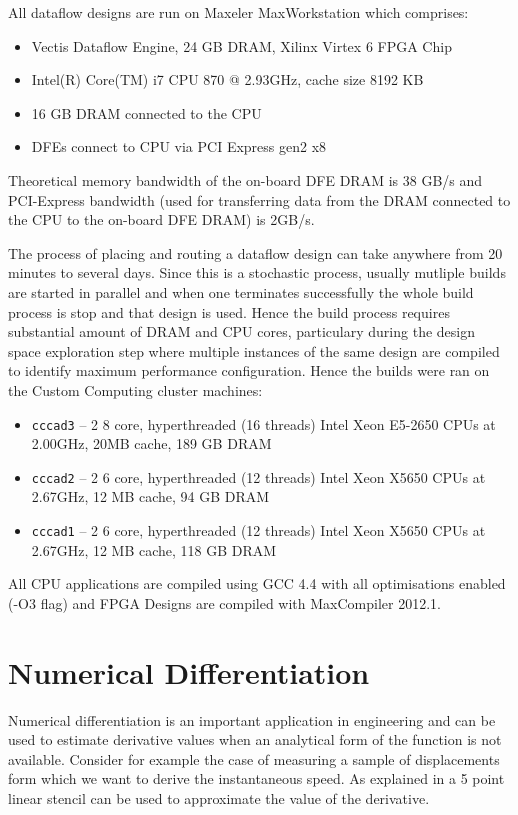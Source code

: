 All dataflow designs are run on Maxeler MaxWorkstation
\cite{MaxWorkstation} which comprises:
\begin{itemize}
\item Vectis Dataflow Engine, 24 GB DRAM, Xilinx Virtex 6 FPGA Chip
\item Intel(R) Core(TM) i7 CPU 870 @ 2.93GHz, cache size 8192 KB
\item 16 GB DRAM connected to the CPU
\item DFEs connect to CPU via PCI Express gen2 x8
\end{itemize}

Theoretical memory bandwidth of the on-board DFE DRAM is 38 GB/s and
PCI-Express bandwidth (used for transferring data from the DRAM
connected to the CPU to the on-board DFE DRAM) is 2GB/s.

The process of placing and routing a dataflow design can take anywhere
from 20 minutes to several days. Since this is a stochastic process,
usually mutliple builds are started in parallel and when one
terminates successfully the whole build process is stop and that
design is used. Hence the build process requires substantial amount of
DRAM and CPU cores, particulary during the design space exploration
step where multiple instances of the same design are compiled to
identify maximum performance configuration. Hence the builds were ran
on the Custom Computing cluster machines:

\begin{itemize}
\item \texttt{cccad3} -- 2 8 core, hyperthreaded (16 threads) Intel
  Xeon E5-2650 CPUs at 2.00GHz, 20MB cache, 189 GB DRAM
\item \texttt{cccad2} -- 2 6 core, hyperthreaded (12 threads) Intel
  Xeon X5650 CPUs at 2.67GHz, 12 MB cache, 94 GB DRAM
\item \texttt{cccad1} -- 2 6 core, hyperthreaded (12 threads) Intel Xeon
  X5650 CPUs at 2.67GHz, 12 MB cache, 118 GB DRAM
\end{itemize}

All CPU applications are compiled using GCC 4.4 with all optimisations
enabled (-O3 flag) and FPGA Designs are compiled with MaxCompiler
2012.1.

\section{Numerical Differentiation}

Numerical differentiation is an important application in engineering
and can be used to estimate derivative values when an analytical form
of the function is not available. Consider for example the case of
measuring a sample of displacements form which we want to derive the
instantaneous speed. As explained in  a 5
point linear stencil can be used to approximate the value of the
derivative.

